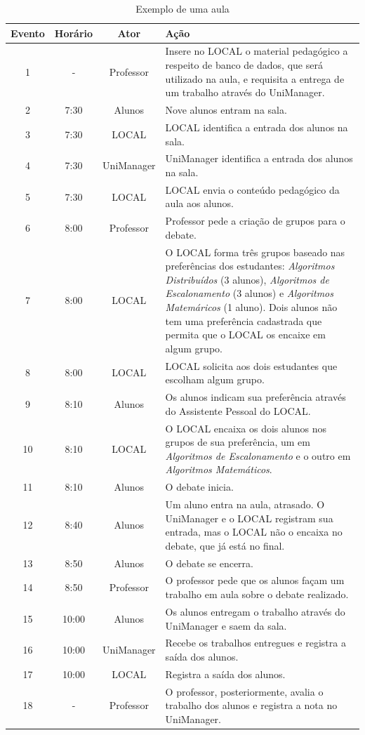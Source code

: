\begin{table}\centering\footnotesize
    \begin{tabular*}{1\textwidth}{@{}cccp{11cm}@{}}
    \toprule
    Evento & Horário & Ator & Ação \\
    \midrule
    1 & - & Professor & Insere no LOCAL o material pedagógico a respeito de banco de dados, que será utilizado na aula, e requisita a entrega de um trabalho através do UniManager. \\
    2 & 7:30 & Alunos & Nove alunos entram na sala. \\
    3 & 7:30 & LOCAL & LOCAL identifica a entrada dos alunos na sala. \\
    4 & 7:30 & UniManager & UniManager identifica a entrada dos alunos na sala. \\
    5 & 7:30 & LOCAL & LOCAL envia o conteúdo pedagógico da aula aos alunos. \\
    6 & 8:00 & Professor & Professor pede a criação de grupos para o debate. \\
    7 & 8:00 & LOCAL & O LOCAL forma três grupos baseado nas preferências dos estudantes: {\em Algoritmos Distribuídos} (3 alunos), {\em Algoritmos de Escalonamento} (3 alunos) e {\em Algoritmos Matemáricos} (1 aluno). Dois alunos não tem uma preferência cadastrada que permita que o LOCAL os encaixe em algum grupo. \\
    8 & 8:00 & LOCAL & LOCAL solicita aos dois estudantes que escolham algum grupo. \\
    9 & 8:10 & Alunos & Os alunos indicam sua preferência através do Assistente Pessoal do LOCAL. \\
    10 & 8:10 & LOCAL & O LOCAL encaixa os dois alunos nos grupos de sua preferência, um em {\em Algoritmos de Escalonamento} e o outro em {\em Algoritmos Matemáticos}. \\
    11 & 8:10 & Alunos & O debate inicia. \\
    12 & 8:40 & Alunos & Um aluno entra na aula, atrasado. O UniManager e o LOCAL registram sua entrada, mas o LOCAL não o encaixa no debate, que já está no final. \\
    13 & 8:50 & Alunos & O debate se encerra. \\
    14 & 8:50 & Professor & O professor pede que os alunos façam um trabalho em aula sobre o debate realizado. \\
    15 & 10:00 & Alunos & Os alunos entregam o trabalho através do UniManager e saem da sala. \\
    16 & 10:00 & UniManager & Recebe os trabalhos entregues e registra a saída dos alunos. \\
    17 & 10:00 & LOCAL & Registra a saída dos alunos. \\
    18 & - & Professor & O professor, posteriormente, avalia o trabalho dos alunos e registra a nota no UniManager. \\
    \bottomrule
  \end{tabular*}
  \caption{Exemplo de uma aula}
  \label{tab:aula}
\end{table}

